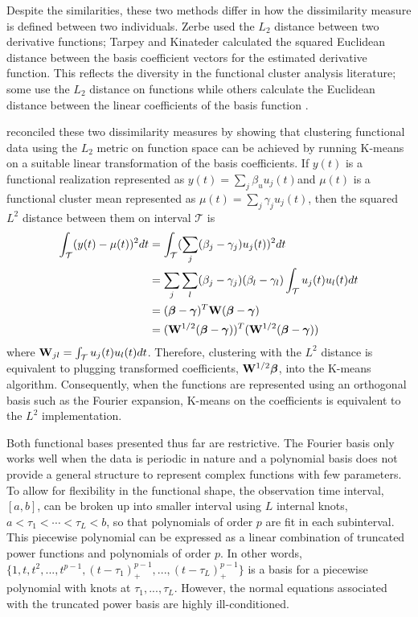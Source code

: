 Despite the similarities, these two methods differ in how the dissimilarity measure is defined between two individuals. Zerbe used the $L_{2}$ distance between two derivative functions; Tarpey and Kinateder calculated the squared Euclidean distance between the basis coefficient vectors for the estimated derivative function. This reflects the diversity in the functional cluster analysis literature; some use the $L_{2}$ distance on functions \cite{hitchcock2007} while others calculate the Euclidean distance between the linear coefficients of the basis function \cite{abraham2003,serban2005, tarpey2003}.
 
\Textcite{tarpey2007} reconciled these two dissimilarity measures by showing that clustering functional data using the $L_{2}$ metric on function space can be achieved by running K-means on a suitable linear transformation of the basis coefficients. If $y(t)$ is a functional realization represented as $y(t)=\sum_{j}\beta_{u}u_{j}(t)$and $\mu(t)$ is a functional cluster mean represented as $\mu(t) = \sum_{j}\gamma_{j}u_{j}(t)$, then the squared $L^{2}$ distance between them on interval $\mathcal{T}$ is
\begin{align*}
\int_{\mathcal{T}}(y(t)-\mu(t))^{2}dt &= \int_{\mathcal{T}}(\sum_{j}(\beta_{j}-\gamma_{j})u_{j}(t))^{2}dt\\
&= \sum_{j}\sum_{l}(\beta_{j}-\gamma_{j})(\beta_{l}-\gamma_{l}) \int_{\mathcal{T}}u_{j}(t)u_{l}(t)dt\\
&=(\boldsymbol\beta-\boldsymbol\gamma)^{T}\mathbf W (\boldsymbol\beta-\boldsymbol\gamma)\\
&=(\mathbf W^{1/2}(\boldsymbol\beta-\boldsymbol\gamma))^{T} (\mathbf W^{1/2}(\boldsymbol\beta-\boldsymbol\gamma))
\end{align*}
where $\mathbf W_{jl} = \int_{\mathcal{T}}u_{j}(t)u_{l}(t)dt$. Therefore, clustering with the $L^{2}$ distance is equivalent to plugging transformed coefficients, $\mathbf W^{1/2}\boldsymbol\beta$, into the K-means algorithm. Consequently, when the functions are represented using an orthogonal basis such as the Fourier expansion, K-means on the coefficients is equivalent to the $L^{2}$ implementation.

Both functional bases presented thus far are restrictive. The Fourier basis only works well when the data is periodic in nature and a polynomial basis does not provide a general structure to represent complex functions with few parameters. 
To allow for flexibility in the functional shape, the observation time interval, $[a,b]$, can be broken up into smaller interval using $L$ internal knots, $a<\tau_{1}<\cdots<\tau_{L}<b$, so that polynomials of order $p$ are fit in each subinterval. This piecewise polynomial can be expressed as a linear combination of truncated power functions and polynomials of order $p$. In other words,
$\{1,t,t^{2},...,t^{p-1},(t-\tau_{1})_{+}^{p-1},...,(t-\tau_{L})_{+}^{p-1}\}$
is a basis for a piecewise polynomial with knots at $\tau_{1},...,\tau_{L}$. However, the normal equations associated with the truncated power basis are highly ill-conditioned. 

